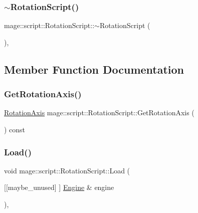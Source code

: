 \subsubsection{\texorpdfstring{$\sim$\+Rotation\+Script()}{~RotationScript()}}
{\footnotesize\ttfamily mage\+::script\+::\+Rotation\+Script\+::$\sim$\+Rotation\+Script (\begin{DoxyParamCaption}{ }\end{DoxyParamCaption})\hspace{0.3cm}{\ttfamily [virtual]}, {\ttfamily [default]}}



\subsection{Member Function Documentation}
\hypertarget{classmage_1_1script_1_1_rotation_script_ac2ef46249d59b379f47336eb250f3a28}{}\label{classmage_1_1script_1_1_rotation_script_ac2ef46249d59b379f47336eb250f3a28} 
\subsubsection{\texorpdfstring{Get\+Rotation\+Axis()}{GetRotationAxis()}}
{\footnotesize\ttfamily \hyperlink{classmage_1_1script_1_1_rotation_script_a54e1d1d0af65f43f5bc5ad65a4b9c00a}{Rotation\+Axis} mage\+::script\+::\+Rotation\+Script\+::\+Get\+Rotation\+Axis (\begin{DoxyParamCaption}{ }\end{DoxyParamCaption}) const\hspace{0.3cm}{\ttfamily [noexcept]}}

\hypertarget{classmage_1_1script_1_1_rotation_script_a7da4165e899facc981c0ee5b1f4a4453}{}\label{classmage_1_1script_1_1_rotation_script_a7da4165e899facc981c0ee5b1f4a4453} 
\subsubsection{\texorpdfstring{Load()}{Load()}}
{\footnotesize\ttfamily void mage\+::script\+::\+Rotation\+Script\+::\+Load (\begin{DoxyParamCaption}\item[{\mbox{[}\mbox{[}maybe\+\_\+unused\mbox{]} \mbox{]} \hyperlink{classmage_1_1_engine}{Engine} \&}]{engine }\end{DoxyParamCaption})\hspace{0.3cm}{\ttfamily [override]}, {\ttfamily [virtual]}}

